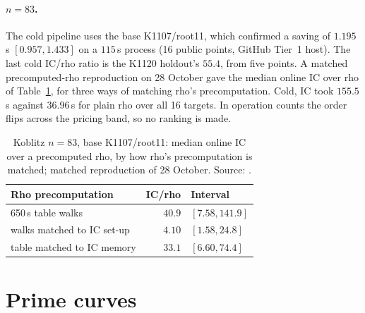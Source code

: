 \paragraph{$n=83$.} The cold pipeline uses the base K1107/root11, which
confirmed a saving of $1.195$\,s $[0.957,1.433]$ on a $115$\,s process (16
public points, GitHub Tier~1 host). The last cold IC/rho ratio is the
K1120 holdout's $55.4$, from five points. A matched precomputed-rho
reproduction on 28 October gave the median online IC over rho of
Table~\ref{tab:distance-n83}, for three ways of matching rho's
precomputation. Cold, IC took $155.5$\,s against $36.96$\,s for plain rho over all 16
targets. In operation counts the order flips across the pricing band, so
no ranking is made.

\begin{table}[t]
\centering\small
\begin{tabular}{@{}lrl@{}}
\toprule
Rho precomputation & IC/rho & Interval \\
\midrule
650\,s table walks & $40.9$ & $[7.58,141.9]$ \\
walks matched to IC set-up & $4.10$ & $[1.58,24.8]$ \\
table matched to IC memory & $33.1$ & $[6.60,74.4]$ \\
\bottomrule
\end{tabular}
\caption[]{Koblitz $n=83$, base K1107/root11: median online IC over a
precomputed rho, by how rho's precomputation is matched; matched
reproduction of 28 October. Source:
.}
\label{tab:distance-n83}
\end{table}

\section{Prime curves}

